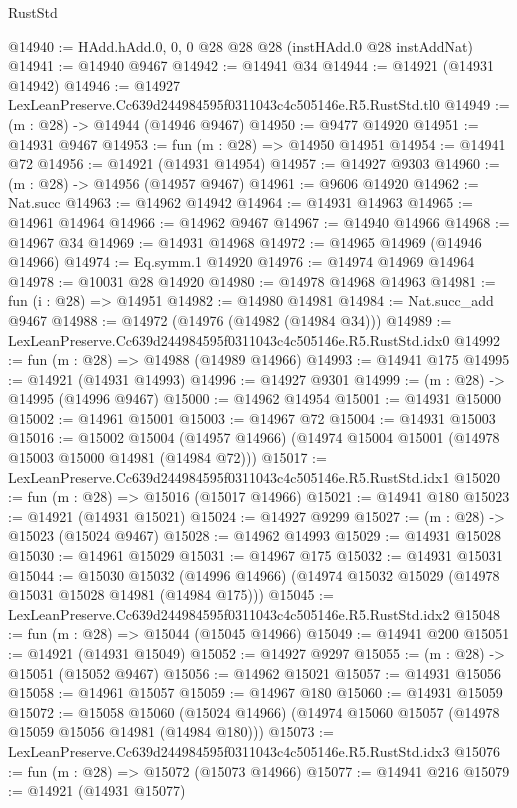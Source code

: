 \begin{lexlean}{RustStd}
\begin{coremodule}
@14940 := HAdd.hAdd.{0, 0, 0} @28 @28 @28 (instHAdd.{0} @28 instAddNat)
@14941 := @14940 @9467
@14942 := @14941 @34
@14944 := @14921 (@14931 @14942)
@14946 := @14927 LexLeanPreserve.Cc639d244984595f0311043c4c505146e.R5.RustStd.tl0
@14949 := (m : @28) -> @14944 (@14946 @9467)
@14950 := @9477 @14920
@14951 := @14931 @9467
@14953 := fun (m : @28) => @14950 @14951
@14954 := @14941 @72
@14956 := @14921 (@14931 @14954)
@14957 := @14927 @9303
@14960 := (m : @28) -> @14956 (@14957 @9467)
@14961 := @9606 @14920
@14962 := Nat.succ
@14963 := @14962 @14942
@14964 := @14931 @14963
@14965 := @14961 @14964
@14966 := @14962 @9467
@14967 := @14940 @14966
@14968 := @14967 @34
@14969 := @14931 @14968
@14972 := @14965 @14969 (@14946 @14966)
@14974 := Eq.symm.{1} @14920
@14976 := @14974 @14969 @14964
@14978 := @10031 @28 @14920
@14980 := @14978 @14968 @14963
@14981 := fun (i : @28) => @14951
@14982 := @14980 @14981
@14984 := Nat.succ_add @9467
@14988 := @14972 (@14976 (@14982 (@14984 @34)))
@14989 := LexLeanPreserve.Cc639d244984595f0311043c4c505146e.R5.RustStd.idx0
@14992 := fun (m : @28) => @14988 (@14989 @14966)
@14993 := @14941 @175
@14995 := @14921 (@14931 @14993)
@14996 := @14927 @9301
@14999 := (m : @28) -> @14995 (@14996 @9467)
@15000 := @14962 @14954
@15001 := @14931 @15000
@15002 := @14961 @15001
@15003 := @14967 @72
@15004 := @14931 @15003
@15016 := @15002
    @15004
    (@14957 @14966)
    (@14974 @15004 @15001 (@14978 @15003 @15000 @14981 (@14984 @72)))
@15017 := LexLeanPreserve.Cc639d244984595f0311043c4c505146e.R5.RustStd.idx1
@15020 := fun (m : @28) => @15016 (@15017 @14966)
@15021 := @14941 @180
@15023 := @14921 (@14931 @15021)
@15024 := @14927 @9299
@15027 := (m : @28) -> @15023 (@15024 @9467)
@15028 := @14962 @14993
@15029 := @14931 @15028
@15030 := @14961 @15029
@15031 := @14967 @175
@15032 := @14931 @15031
@15044 := @15030
    @15032
    (@14996 @14966)
    (@14974 @15032 @15029 (@14978 @15031 @15028 @14981 (@14984 @175)))
@15045 := LexLeanPreserve.Cc639d244984595f0311043c4c505146e.R5.RustStd.idx2
@15048 := fun (m : @28) => @15044 (@15045 @14966)
@15049 := @14941 @200
@15051 := @14921 (@14931 @15049)
@15052 := @14927 @9297
@15055 := (m : @28) -> @15051 (@15052 @9467)
@15056 := @14962 @15021
@15057 := @14931 @15056
@15058 := @14961 @15057
@15059 := @14967 @180
@15060 := @14931 @15059
@15072 := @15058
    @15060
    (@15024 @14966)
    (@14974 @15060 @15057 (@14978 @15059 @15056 @14981 (@14984 @180)))
@15073 := LexLeanPreserve.Cc639d244984595f0311043c4c505146e.R5.RustStd.idx3
@15076 := fun (m : @28) => @15072 (@15073 @14966)
@15077 := @14941 @216
@15079 := @14921 (@14931 @15077)

\end{coremodule}
\end{lexlean}
